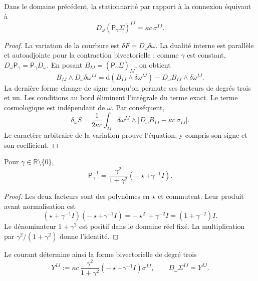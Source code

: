 \begin{HMTCompactSection}
\begin{theorem}
\label{x_reciprocidad:vii:thm:ecuacion-cartan-holst}
Dans le domaine précédent, la stationnarité par rapport à la connexion
équivaut à
\begin{equation}
 D_\omega(\mathsf P_\gamma\Sigma)^{IJ}
       =\kappa c\,\sigma^{IJ}.
 \label{x_reciprocidad:vii:eq:ecuacion-cartan-holst}
\end{equation}
\end{theorem}
\begin{proof}
La variation de la courbure est
\(\delta F=D_\omega\delta\omega\). La dualité interne est parallèle
et autoadjointe pour la contraction bivectorielle ; comme \(\gamma\) est
constant, \(D_\omega\mathsf P_\gamma=\mathsf P_\gamma D_\omega\).
En posant \(B_{IJ}=(\mathsf P_\gamma\Sigma)_{IJ}\), on obtient
\[
 B_{IJ}\wedge D_\omega\delta\omega^{IJ}
 =\mathrm d(B_{IJ}\wedge\delta\omega^{IJ})
   -D_\omega B_{IJ}\wedge\delta\omega^{IJ}.
\]
La dernière forme change de signe lorsqu'on permute ses facteurs de degrés trois
et un. Les conditions au bord éliminent l'intégrale du terme
exact. Le terme cosmologique est indépendant de \(\omega\).
Par conséquent,
\[
 \delta_\omega S=
 \frac1{2\kappa c}\int_M\delta\omega^{IJ}\wedge
       \bigl[D_\omega B_{IJ}-\kappa c\,\sigma_{IJ}\bigr].
\]
Le caractère arbitraire de la variation prouve l'équation, y compris son signe et son coefficient.
\end{proof}

\begin{lemma}
\label{x_reciprocidad:vii:lem:inversa-holst}
Pour \(\gamma\in\mathbb R\setminus\{0\}\),
\begin{equation}
 \mathsf P_\gamma^{-1}
 =\frac{\gamma^2}{1+\gamma^2}
                      (-\star+\gamma^{-1}I).
 \label{x_reciprocidad:vii:eq:inversa-holst}
\end{equation}
\end{lemma}
\begin{proof}
Les deux facteurs sont des polynômes en \(\star\) et commutent. Leur produit
avant normalisation est
\[
 (\star+\gamma^{-1}I)(-\star+\gamma^{-1}I)
 =-\star^2+\gamma^{-2}I=(1+\gamma^{-2})I.
\]
Le dénominateur \(1+\gamma^2\) est positif dans le domaine réel fixé. La multiplication par \(\gamma^2/(1+\gamma^2)\) donne l'identité.
\end{proof}

Le courant détermine ainsi la forme bivectorielle de degré trois
\begin{equation}
 Y^{IJ}:=\kappa c\,
   \frac{\gamma^2}{1+\gamma^2}
   (-\star+\gamma^{-1}I)\sigma^{IJ},
 \qquad D_\omega\Sigma^{IJ}=Y^{IJ}.
 \label{x_reciprocidad:vii:eq:corriente-dualizada}
\end{equation}


\end{HMTCompactSection}
